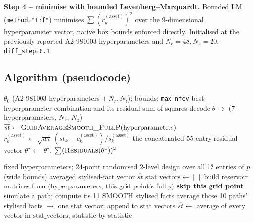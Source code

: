 \documentclass[11pt]{article}
\begin{document}
\textbf{Step 4 -- minimise with bounded Levenberg--Marquardt.} Bounded LM
(\texttt{method="trf"}) minimises $\sum(r_k^{(\text{asset})})^2$ over the 9-dimensional
hyperparameter vector, native box bounds enforced directly. Initialised at the
previously reported A2-981003 hyperparameters and $N_r=48,N_z=20$;
\texttt{diff\_step=0.1}.

\subsection{Algorithm (pseudocode)}
\begin{algorithm}[h]
\caption{\textsc{BoundedLM\_Hyperparameters} (outer) calling \textsc{GridAverageSmooth\_FullP} (inner)}
\label{alg:main}
\begin{algorithmic}[1]
\Require $\theta_0$ (A2-981003 hyperparameters $+\,N_r,N_z$); bounds; \texttt{max\_nfev}
\Ensure best hyperparameter combination and its residual sum of squares
  \State decode $\theta \to$ (7 hyperparameters, $N_r$, $N_z$)
  \State $\overline{st} \gets \textsc{GridAverageSmooth\_FullP}(\text{hyperparameters})$ 
    \State $r_k^{(\text{asset})} \gets \sqrt{w_k}\,(\overline{st}_k-c_k^{(\text{asset})})/s_k^{(\text{asset})}$
  \EndFor
  \State \Return the concatenated 55-entry residual vector
\EndFunction
\State $\theta^\star \gets$ 
\State \Return $\theta^\star$, $\sum(\textsc{Residuals}(\theta^\star))^2$
\end{algorithmic}
\end{algorithm}

\begin{algorithm}[h]
\caption{\textsc{GridAverageSmooth\_FullP}(hyperparameters) -- average smooth stylised facts over all 12 gridded entries of $p$}
\label{alg:inner}
\begin{algorithmic}[1]
\Require fixed hyperparameters; 24-point randomised 2-level design over all 12 entries of $p$ (wide bounds)
\Ensure averaged stylised-fact vector $\overline{st}$
\State $\text{stat\_vectors}\gets[\,]$
  \State build reservoir matrices from (hyperparameters, this grid point's full $p$)
   \textbf{skip this grid point} \EndIf
   simulate a path; compute its 11 SMOOTH stylised facts \EndFor
  \State average those 10 paths' stylised facts $\to$ one stat vector; append to $\text{stat\_vectors}$
\EndFor
\State \Return $\overline{st} \gets$ average of every vector in $\text{stat\_vectors}$, statistic by statistic
\end{algorithmic}
\end{algorithm}
\end{document}
